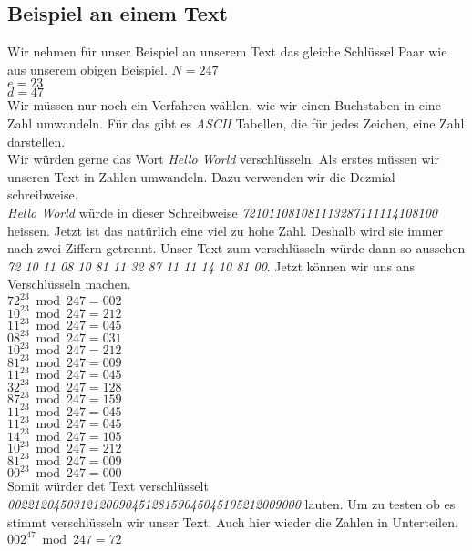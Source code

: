 \subsection{Beispiel an einem Text}
Wir nehmen für unser Beispiel an unserem Text das gleiche Schlüssel Paar wie aus unserem obigen Beispiel.
$ N = 247 $\\
$ e = 23 $\\
$ d = 47 $\\
Wir müssen nur noch ein Verfahren wählen, wie wir einen Buchstaben in eine Zahl umwandeln. Für das gibt es \textit{ASCII} Tabellen, die für jedes Zeichen, eine Zahl darstellen.\\
Wir würden gerne das Wort \textit{Hello World} verschlüsseln. Als erstes müssen wir unseren Text in Zahlen umwandeln. Dazu verwenden wir die Dezmial schreibweise.\\
\textit{Hello World} würde in dieser Schreibweise \textit{721011081081113287111114108100} heissen. Jetzt ist das natürlich eine viel zu hohe Zahl. Deshalb wird sie immer nach zwei Ziffern getrennt. Unser Text zum verschlüsseln würde dann so aussehen \textit{72 10 11 08 10 81 11 32 87 11 11 14 10 81 00}. Jetzt können wir uns ans Verschlüsseln machen. \\
$ 72^{23} \bmod 247 = 002 $ \\
$ 10^{23} \bmod 247 = 212 $ \\
$ 11^{23} \bmod 247 = 045 $ \\
$ 08^{23} \bmod 247 = 031 $ \\
$ 10^{23} \bmod 247 = 212 $ \\
$ 81^{23} \bmod 247 = 009 $ \\
$ 11^{23} \bmod 247 = 045 $ \\
$ 32^{23} \bmod 247 = 128 $ \\
$ 87^{23} \bmod 247 = 159 $ \\
$ 11^{23} \bmod 247 = 045 $ \\
$ 11^{23} \bmod 247 = 045 $ \\
$ 14^{23} \bmod 247 = 105 $ \\
$ 10^{23} \bmod 247 = 212 $ \\
$ 81^{23} \bmod 247 = 009 $ \\
$ 00^{23} \bmod 247 = 000 $ \\
Somit würder det Text verschlüsselt \textit{002212045031212009045128159045045105212009000} lauten.
Um zu testen ob es stimmt verschlüsseln wir unser Text. Auch hier wieder die Zahlen in Unterteilen.
$ 002^{47} \bmod 247 = 72 $ \\
